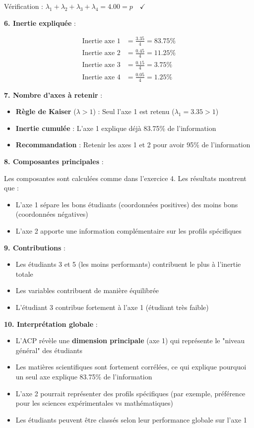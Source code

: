 \documentclass[11pt,a4paper]{article}
\begin{document}
Vérification : $\lambda_1 + \lambda_2 + \lambda_3 + \lambda_4 = 4.00 = p \quad \checkmark$

\textbf{6. Inertie expliquée} :

\begin{align*}
\text{Inertie axe 1} &= \frac{3.35}{4} = 83.75\% \\
\text{Inertie axe 2} &= \frac{0.45}{4} = 11.25\% \\
\text{Inertie axe 3} &= \frac{0.15}{4} = 3.75\% \\
\text{Inertie axe 4} &= \frac{0.05}{4} = 1.25\%
\end{align*}

\textbf{7. Nombre d'axes à retenir} :

\begin{itemize}
    \item \textbf{Règle de Kaiser} ($\lambda > 1$) : Seul l'axe 1 est retenu ($\lambda_1 = 3.35 > 1$)
    \item \textbf{Inertie cumulée} : L'axe 1 explique déjà 83.75\% de l'information
    \item \textbf{Recommandation} : Retenir les axes 1 et 2 pour avoir 95\% de l'information
\end{itemize}

\textbf{8. Composantes principales} :

Les composantes sont calculées comme dans l'exercice 4. Les résultats montrent que :
\begin{itemize}
    \item L'axe 1 sépare les bons étudiants (coordonnées positives) des moins bons (coordonnées négatives)
    \item L'axe 2 apporte une information complémentaire sur les profils spécifiques
\end{itemize}

\textbf{9. Contributions} :

\begin{itemize}
    \item Les étudiants 3 et 5 (les moins performants) contribuent le plus à l'inertie totale
    \item Les variables contribuent de manière équilibrée
    \item L'étudiant 3 contribue fortement à l'axe 1 (étudiant très faible)
\end{itemize}

\textbf{10. Interprétation globale} :

\begin{itemize}
    \item L'ACP révèle une \textbf{dimension principale} (axe 1) qui représente le "niveau général" des étudiants
    \item Les matières scientifiques sont fortement corrélées, ce qui explique pourquoi un seul axe explique 83.75\% de l'information
    \item L'axe 2 pourrait représenter des profils spécifiques (par exemple, préférence pour les sciences expérimentales vs mathématiques)
    \item Les étudiants peuvent être classés selon leur performance globale sur l'axe 1
\end{itemize}
\end{document}
